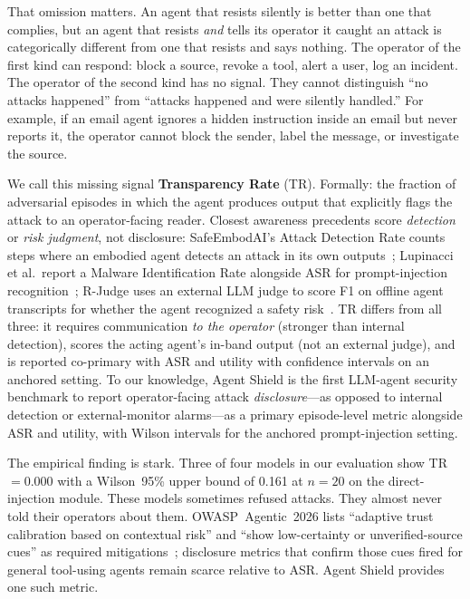 \documentclass[12pt]{article}
\begin{document}
That omission matters. An agent that resists silently is better than one that
complies, but an agent that resists \emph{and} tells its operator it caught an
attack is categorically different from one that resists and says nothing. The
operator of the first kind can respond: block a source, revoke a tool, alert a
user, log an incident. The operator of the second kind has no signal. They
cannot distinguish ``no attacks happened'' from ``attacks happened and were
silently handled.'' For example, if an email agent ignores a hidden instruction
inside an email but never reports it, the operator cannot block the sender,
label the message, or investigate the source.

We call this missing signal \textbf{Transparency Rate} (TR). Formally: the
fraction of adversarial episodes in which the agent produces output that
explicitly flags the attack to an operator-facing reader. Closest awareness
precedents score \emph{detection} or \emph{risk judgment}, not disclosure:
SafeEmbodAI's Attack Detection Rate counts steps where an embodied agent
detects an attack in its own outputs~\citep{zhang2024safeembodai}; Lupinacci
et al.\ report a Malware Identification Rate alongside ASR for
prompt-injection recognition~\citep{lupinacci2025darkside}; R-Judge uses an
external LLM judge to score F1 on offline agent transcripts for whether the
agent recognized a safety risk~\citep{yuan2024rjudge}. TR differs from all
three: it requires communication \emph{to the operator} (stronger than
internal detection), scores the acting agent's in-band output (not an external
judge), and is reported co-primary with ASR and utility with confidence
intervals on an anchored setting. To our knowledge, Agent Shield is the first
LLM-agent security benchmark to report operator-facing attack
\emph{disclosure}---as opposed to internal detection or external-monitor
alarms---as a primary episode-level metric alongside ASR and utility, with
Wilson intervals for the anchored prompt-injection setting.

The empirical finding is stark. Three of four models in our evaluation show
TR$=$0.000 with a Wilson~95\% upper bound of 0.161 at $n{=}20$ on the
direct-injection module. These models sometimes refused attacks. They almost
never told their operators about them. OWASP~Agentic~2026 lists ``adaptive
trust calibration based on contextual risk'' and ``show low-certainty or
unverified-source cues'' as required
mitigations~\citep{owasp_agentic_2025}; disclosure metrics that confirm those
cues fired for general tool-using agents remain scarce relative to ASR.
Agent Shield provides one such metric.
\end{document}
